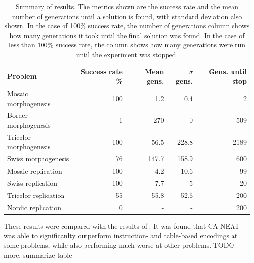 \begin{table}[h]
    \centering
    \caption[Summary of results]{
Summary of results.
The metrics shown are the success rate and the mean number of generations until a solution is found, with standard deviation also shown.
In the case of 100\% success rate, the number of generations column shows how many generations it took until the final solution was found.
In the case of less than 100\% success rate, the column shows how many generations were run until the experiment was stopped.
}
\begin{tabular}{lrrrr}
\hline
 Problem              &   Success rate \% &   Mean gens. &   $\sigma$ gens. &   Gens. until stop \\
\hline
Mosaic morphogenesis      &              100 &                1.2 &                 0.4 &                        2 \\
Border morphogenesis      &                1 &              270   &                 0   &                      509 \\
Tricolor morphogenesis    &              100 &               56.5 &               228.8 &                     2189 \\
Swiss morphogenesis       &               76 &              147.7 &               158.9 &                      600 \\
Mosaic replication        &              100 &                4.2 &                10.6 &                       99 \\
Swiss replication         &              100 &                7.7 &                 5   &                       20 \\
Tricolor replication      &               55 &               55.8 &                52.6 &                      200 \\
Nordic replication        &               0  &                  - &                   - &                      200 \\
\hline
\end{tabular}
\label{tbl:results}
\end{table}

These results were compared with the results of \cite{nichele2014evolutionary}.
It was found that CA-NEAT was able to significanlty outperform instruction- and table-based encodings at some problems, while also performing much worse at other problems.
TODO more, summarize table

